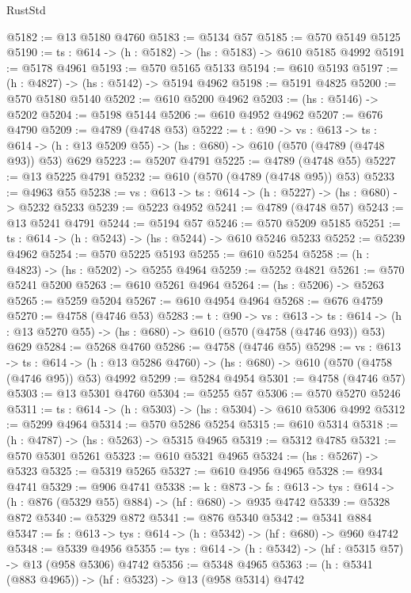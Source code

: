 \begin{lexlean}{RustStd}
\begin{coremodule}
@5182 := @13 @5180 @4760
@5183 := @5134 @57
@5185 := @570 @5149 @5125
@5190 := {ts : @614} -> (h : @5182) -> (hs : @5183) -> @610 @5185 @4992
@5191 := @5178 @4961
@5193 := @570 @5165 @5133
@5194 := @610 @5193
@5197 := (h : @4827) -> (hs : @5142) -> @5194 @4962
@5198 := @5191 @4825
@5200 := @570 @5180 @5140
@5202 := @610 @5200 @4962
@5203 := (hs : @5146) -> @5202
@5204 := @5198 @5144
@5206 := @610 @4952 @4962
@5207 := @676 @4790
@5209 := @4789 (@4748 @53)
@5222 := {t : @90} ->
  {vs : @613} ->
  {ts : @614} -> (h : @13 @5209 @55) -> (hs : @680) -> @610 (@570 (@4789 (@4748 @93)) @53) @629
@5223 := @5207 @4791
@5225 := @4789 (@4748 @55)
@5227 := @13 @5225 @4791
@5232 := @610 (@570 (@4789 (@4748 @95)) @53)
@5233 := @4963 @55
@5238 := {vs : @613} -> {ts : @614} -> (h : @5227) -> (hs : @680) -> @5232 @5233
@5239 := @5223 @4952
@5241 := @4789 (@4748 @57)
@5243 := @13 @5241 @4791
@5244 := @5194 @57
@5246 := @570 @5209 @5185
@5251 := {ts : @614} -> (h : @5243) -> (hs : @5244) -> @610 @5246 @5233
@5252 := @5239 @4962
@5254 := @570 @5225 @5193
@5255 := @610 @5254
@5258 := (h : @4823) -> (hs : @5202) -> @5255 @4964
@5259 := @5252 @4821
@5261 := @570 @5241 @5200
@5263 := @610 @5261 @4964
@5264 := (hs : @5206) -> @5263
@5265 := @5259 @5204
@5267 := @610 @4954 @4964
@5268 := @676 @4759
@5270 := @4758 (@4746 @53)
@5283 := {t : @90} ->
  {vs : @613} ->
  {ts : @614} -> (h : @13 @5270 @55) -> (hs : @680) -> @610 (@570 (@4758 (@4746 @93)) @53) @629
@5284 := @5268 @4760
@5286 := @4758 (@4746 @55)
@5298 := {vs : @613} ->
  {ts : @614} -> (h : @13 @5286 @4760) -> (hs : @680) -> @610 (@570 (@4758 (@4746 @95)) @53) @4992
@5299 := @5284 @4954
@5301 := @4758 (@4746 @57)
@5303 := @13 @5301 @4760
@5304 := @5255 @57
@5306 := @570 @5270 @5246
@5311 := {ts : @614} -> (h : @5303) -> (hs : @5304) -> @610 @5306 @4992
@5312 := @5299 @4964
@5314 := @570 @5286 @5254
@5315 := @610 @5314
@5318 := (h : @4787) -> (hs : @5263) -> @5315 @4965
@5319 := @5312 @4785
@5321 := @570 @5301 @5261
@5323 := @610 @5321 @4965
@5324 := (hs : @5267) -> @5323
@5325 := @5319 @5265
@5327 := @610 @4956 @4965
@5328 := @934 @4741
@5329 := @906 @4741
@5338 := {k : @873} ->
  {fs : @613} -> {tys : @614} -> (h : @876 (@5329 @55) @884) -> (hf : @680) -> @935 @4742
@5339 := @5328 @872
@5340 := @5329 @872
@5341 := @876 @5340
@5342 := @5341 @884
@5347 := {fs : @613} -> {tys : @614} -> (h : @5342) -> (hf : @680) -> @960 @4742
@5348 := @5339 @4956
@5355 := {tys : @614} -> (h : @5342) -> (hf : @5315 @57) -> @13 (@958 @5306) @4742
@5356 := @5348 @4965
@5363 := (h : @5341 (@883 @4965)) -> (hf : @5323) -> @13 (@958 @5314) @4742

\end{coremodule}
\end{lexlean}
